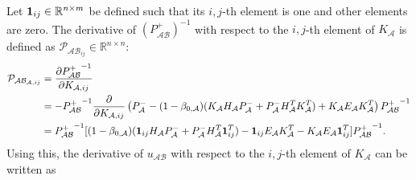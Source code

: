 \documentclass[10pt]{article}
\renewcommand{\Re}{\ensuremath{\mathbb{R}}}
\theoremstyle{plain}\theorembodyfont{\normalfont}
\begin{document}
Let $\Iij\in \Re^{n\times m}$ be defined such that its $i,j$-th element is one and other elements are zero. The derivative of $(P_{\mathcal{A}\mathcal{B}}^+)^{-1}$ with respect to the $i,j$-th element of $K_\mathcal{A}$ is defined as $\mathcal{P}_{\mathcal{A}\mathcal{B}_{ij}}\in\Re^{n\times n}$:
\begin{align}
\begin{split}
\mathcal{P}_{\mathcal{A}\mathcal{B}_{\mathcal{A},ij}}&=\frac{\partial {P^+_{\mathcal{A}\mathcal{B}}}^{-1}}{\partial K_{\mathcal{A},ij}}
\\
&=-{P_{\mathcal{A}\mathcal{B}}^+}^{-1}\frac{\partial}{\partial K_{\mathcal{A},ij}}
\left(
P^-_\mathcal{A}-(1-\beta_{0,\mathcal{A}})(K_\mathcal{A}H_\mathcal{A}P^-_\mathcal{A}+P^-_\mathcal{A}H_\mathcal{A}^TK_\mathcal{A}^T)+K_\mathcal{A}E_\mathcal{A}K_\mathcal{A}^T
\right)
{P_{\mathcal{A}\mathcal{B}}^+}^{-1}
\\
&={P_{\mathcal{A}\mathcal{B}}^+}^{-1}[(1-\beta_{0,\mathcal{A}})(\mathbf{1}_{ij} H_\mathcal{A}P_\mathcal{A}^-+P_\mathcal{A}^-H_\mathcal{A}^T\mathbf{1}_{ij}^T)-\mathbf{1}_{ij} E_\mathcal{A}K_\mathcal{A}^T -K_\mathcal{A}E_\mathcal{A}\mathbf{1}_{ij}^T]{P_{\mathcal{A}\mathcal{B}}^+}^{-1}.
\end{split}
\end{align}
Using this, the derivative of $u_{\mathcal{A}\mathcal{B}}$ with respect to the $i,j$-th element of $K_\mathcal{A}$ can be written as
\end{document}
